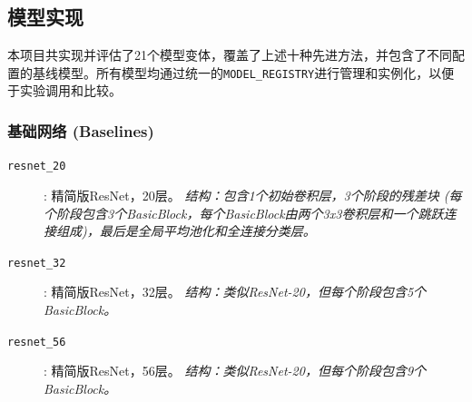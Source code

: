 \documentclass[a4paper]{article}
\begin{document}
\subsection{模型实现}
本项目共实现并评估了21个模型变体，覆盖了上述十种先进方法，并包含了不同配置的基线模型。所有模型均通过统一的\texttt{MODEL\_REGISTRY}进行管理和实例化，以便于实验调用和比较。

\subsubsection{基础网络 (Baselines)}
\begin{description}
    \item[\texttt{resnet\_20}]: 精简版ResNet，20层。 \textit{结构：包含1个初始卷积层，3个阶段的残差块 (每个阶段包含3个BasicBlock，每个BasicBlock由两个3x3卷积层和一个跳跃连接组成)，最后是全局平均池化和全连接分类层。}
    \item[\texttt{resnet\_32}]: 精简版ResNet，32层。 \textit{结构：类似ResNet-20，但每个阶段包含5个BasicBlock。}
    \item[\texttt{resnet\_56}]: 精简版ResNet，56层。 \textit{结构：类似ResNet-20，但每个阶段包含9个BasicBlock。}
\end{description}
\end{document}

